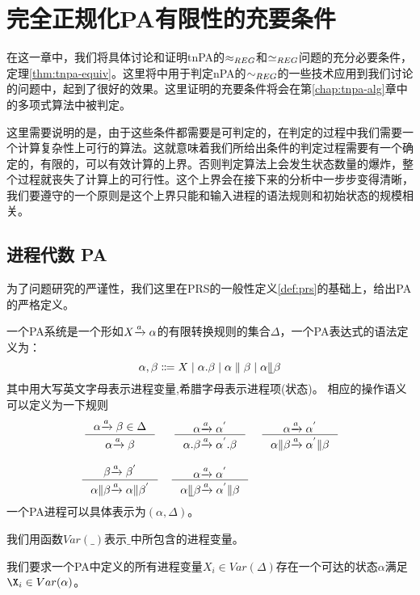 \chapter{完全正规化PA有限性的充要条件}
\label{chap:tnpa-equiv}

在这一章中，我们将具体讨论和证明tnPA的$\approx_{REG}$和$\simeq_{REG}$问题的充分必要条件，定理\ref{thm:tnpa-equiv}。这里将\cite{Kucera1996}中用于判定nPA的$\sim_{REG}$的一些技术应用到我们讨论的问题中，起到了很好的效果。这里证明的充要条件将会在第\ref{chap:tnpa-alg}章中的多项式算法中被判定。

这里需要说明的是，由于这些条件都需要是可判定的，在判定的过程中我们需要一个计算复杂性上可行的算法。这就意味着我们所给出条件的判定过程需要有一个确定的，有限的，可以有效计算的上界。否则判定算法上会发生状态数量的爆炸，整个过程就丧失了计算上的可行性。这个上界会在接下来的分析中一步步变得清晰，我们要遵守的一个原则是这个上界只能和输入进程的语法规则和初始状态的规模相关。

\section{进程代数 PA}
\label{sec:pa-def}

为了问题研究的严谨性，我们这里在PRS的一般性定义\ref{def:prs}的基础上，给出PA的严格定义。

\begin{defn}[PA 定义]\label{def:pa}
一个PA系统是一个形如$X{\xrightarrow{a}{}}\alpha$的有限转换规则的集合$\Delta$，一个PA表达式的语法定义为：
$$\alpha,\beta\Coloneqq X\mid \alpha.\beta\mid\alpha\parallel\beta\mid\alpha\llfloor\beta$$
其中用大写英文字母表示进程变量,希腊字母表示进程项(状态)。
相应的操作语义可以定义为一下规则
\[\begin{array}{ccc}
$\inference{\alpha\act{a}\beta\in\Delta}{\alpha\act{a}\beta}$ &
$\inference{\alpha\act{a}\alpha^{'}}{\alpha.\beta\act{a}\alpha^{'}.\beta}$ &
$\inference{\alpha\act{a}\alpha^{'}}{\alpha\| \beta\act{a}\alpha^{'}\|\beta}$ \\
 \\
$\inference{\beta\act{a}\beta^{'}}{\alpha\| \beta\act{a}\alpha \| \beta^{'}}$ &
$\inference{\alpha\act{a}\alpha^{'}}{\alpha\llfloor \beta\act{a}\alpha^{'}\|\beta}$ &
\end{array}\]
一个PA进程可以具体表示为$(\alpha,\Delta)$。
\end{defn}

我们用函数$Var(\_)$表示$\_$中所包含的进程变量。

我们要求一个PA中定义的所有进程变量$X_i\in Var(\Delta)$存在一个可达的状态$\alpha$满足$\X_i\in Var(\alpha)$。

